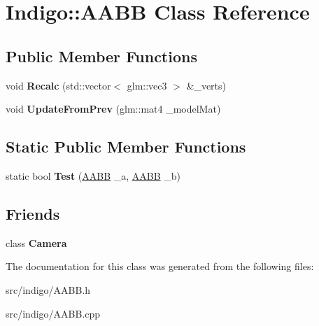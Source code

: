 \hypertarget{class_indigo_1_1_a_a_b_b}{}\section{Indigo\+:\+:A\+A\+BB Class Reference}
\label{class_indigo_1_1_a_a_b_b}
\subsection*{Public Member Functions}
\begin{DoxyCompactItemize}
\item 
\mbox{\label{class_indigo_1_1_a_a_b_b_acb624dc8068d277656712c9904455ae7}} 
void {\bfseries Recalc} (std\+::vector$<$ glm\+::vec3 $>$ \&\+\_\+verts)
\item 
\mbox{\label{class_indigo_1_1_a_a_b_b_ab6259d73b28d9180bb232f09a2c2fe75}} 
void {\bfseries Update\+From\+Prev} (glm\+::mat4 \+\_\+model\+Mat)
\end{DoxyCompactItemize}
\subsection*{Static Public Member Functions}
\begin{DoxyCompactItemize}
\item 
\mbox{\label{class_indigo_1_1_a_a_b_b_ae37c74a1e633929b06b6cab1fa678451}} 
static bool {\bfseries Test} (\hyperlink{class_indigo_1_1_a_a_b_b}{A\+A\+BB} \+\_\+a, \hyperlink{class_indigo_1_1_a_a_b_b}{A\+A\+BB} \+\_\+b)
\end{DoxyCompactItemize}
\subsection*{Friends}
\begin{DoxyCompactItemize}
\item 
\mbox{\label{class_indigo_1_1_a_a_b_b_ad8bd9afbbd7af19d996da80e9d25890d}} 
class {\bfseries Camera}
\end{DoxyCompactItemize}


The documentation for this class was generated from the following files\+:\begin{DoxyCompactItemize}
\item 
src/indigo/A\+A\+B\+B.\+h\item 
src/indigo/A\+A\+B\+B.\+cpp\end{DoxyCompactItemize}
